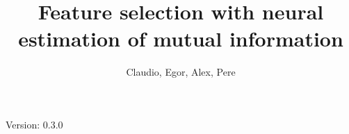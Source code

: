 \documentclass{mypaper}
\author{
Claudio,
Egor,
Alex,
Pere
}
\title{Feature selection with neural estimation of mutual information}
\begin{document}
\maketitle

Version: 0.3.0







\end{document}
